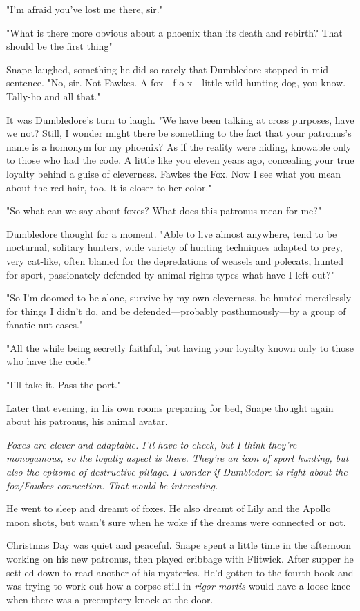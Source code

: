 "I'm afraid you've lost me there, sir."

"What is there more obvious about a phoenix than its death and rebirth? That should be the first thing{\el}"

Snape laughed, something he did so rarely that Dumbledore stopped in mid-sentence. "No, sir. Not Fawkes. A fox—f-o-x—little wild hunting dog, you know. Tally-ho and all that."

It was Dumbledore's turn to laugh. "We have been talking at cross purposes, have we not? Still, I wonder{\el} might there be something to the fact that your patronus's name is a homonym for my phoenix? As if the reality were hiding, knowable only to those who had the code. A little like you eleven years ago, concealing your true loyalty behind a guise of cleverness. Fawkes the Fox. Now I see what you mean about the red hair, too. It is closer to her color."

"So what can we say about foxes? What does this patronus mean for me?"

Dumbledore thought for a moment. "Able to live almost anywhere, tend to be nocturnal, solitary hunters, wide variety of hunting techniques adapted to prey, very cat-like, often blamed for the depredations of weasels and polecats, hunted for sport, passionately defended by animal-rights types{\el} what have I left out?"

"So I'm doomed to be alone, survive by my own cleverness, be hunted mercilessly for things I didn't do, and be defended—probably posthumously—by a group of fanatic nut-cases."

"All the while being secretly faithful, but having your loyalty known only to those who have the code."

"I'll take it. Pass the port."

Later that evening, in his own rooms preparing for bed, Snape thought again about his patronus, his animal avatar.

\emph{Foxes are clever and adaptable. I'll have to check, but I think they're monogamous, so the loyalty aspect is there. They're an icon of sport hunting, but also the epitome of destructive pillage. I wonder if Dumbledore is right about the fox\slash Fawkes connection. That would be interesting.}

He went to sleep and dreamt of foxes. He also dreamt of Lily and the Apollo moon shots, but wasn't sure when he woke if the dreams were connected or not.

Christmas Day was quiet and peaceful. Snape spent a little time in the afternoon working on his new patronus, then played cribbage with Flitwick. After supper he settled down to read another of his mysteries. He'd gotten to the fourth book and was trying to work out how a corpse still in \emph{rigor mortis} would have a loose knee when there was a preemptory knock at the door.

